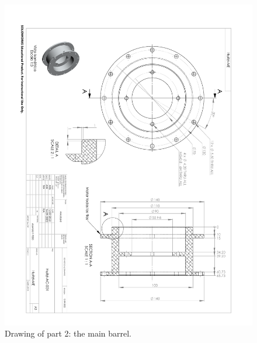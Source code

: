 \begin{figure}
\begin{center}
\includegraphics[angle=180,width=0.9\linewidth]{figures/huitzi-f20-part-2.pdf}
\end{center}
\caption{Drawing of part 2: the main barrel.}
\label{figure:huitzi-f20-part-2}
\end{figure}

